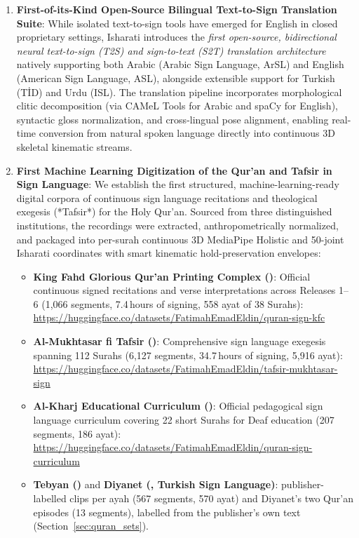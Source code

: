 \begin{enumerate}[leftmargin=*,itemsep=4pt]
  \item \textbf{First-of-its-Kind Open-Source Bilingual Text-to-Sign Translation Suite}:
    While isolated text-to-sign tools have emerged for English in closed proprietary settings, Isharati introduces the \emph{first open-source, bidirectional neural text-to-sign (T2S) and sign-to-text (S2T) translation architecture} natively supporting both Arabic (Arabic Sign Language, ArSL) and English (American Sign Language, ASL), alongside extensible support for Turkish (T\.{I}D) and Urdu (ISL). The translation pipeline incorporates morphological clitic decomposition (via CAMeL Tools for Arabic and spaCy for English), syntactic gloss normalization, and cross-lingual pose alignment, enabling real-time conversion from natural spoken language directly into continuous 3D skeletal kinematic streams.

  \item \textbf{First Machine Learning Digitization of the Qur'an and Tafsir in Sign Language}:
    We establish the first structured, machine-learning-ready digital corpora of continuous sign language recitations and theological exegesis (*Tafsir*) for the Holy Qur'an. Sourced from three distinguished institutions, the recordings were extracted, anthropometrically normalized, and packaged into per-surah continuous 3D MediaPipe Holistic and 50-joint Isharati coordinates with smart kinematic hold-preservation envelopes:
    \begin{itemize}[leftmargin=*,itemsep=2pt]
      \item \textbf{King Fahd Glorious Qur'an Printing Complex ()}:
        Official continuous signed recitations and verse interpretations across Releases 1--6 (1,066 segments, 7.4\,hours of signing, 558 ayat of 38 Surahs):\\
        \url{https://huggingface.co/datasets/FatimahEmadEldin/quran-sign-kfc}
      \item \textbf{Al-Mukhtasar fi Tafsir ()}:
        Comprehensive sign language exegesis spanning 112 Surahs (6,127 segments, 34.7\,hours of signing, 5,916 ayat):\\
        \url{https://huggingface.co/datasets/FatimahEmadEldin/tafsir-mukhtasar-sign}
      \item \textbf{Al-Kharj Educational Curriculum ()}:
        Official pedagogical sign language curriculum covering 22 short Surahs for Deaf education (207 segments, 186 ayat):\\
        \url{https://huggingface.co/datasets/FatimahEmadEldin/quran-sign-curriculum}
      \item \textbf{Tebyan ()} and \textbf{Diyanet (, Turkish Sign Language)}: publisher-labelled
        clips per ayah (567 segments, 570 ayat) and Diyanet's two Qur'an episodes (13 segments), labelled from the
        publisher's own text (Section~\ref{sec:quran_sets}).
    \end{itemize}


\end{enumerate}
